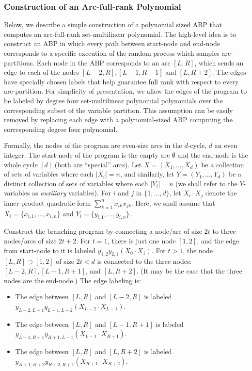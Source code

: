 \documentclass[10pt,a4paper]{article}
\theoremstyle{definition}%
\theoremstyle{plain}
\begin{document}
\subsubsection{Construction of an Arc-full-rank Polynomial}\label{subsubsec:arc-full-rank-poly}

Below, we describe a simple construction of a polynomial sized ABP that computes an arc-full-rank set-multilinear polynomial.
The high-level idea is to construct an ABP in which every path between start-node and end-node
corresponds to a specific execution of the random process which samples arc-partitions. Each node in the ABP corresponds to an arc $[L, R]$, which sends an edge to each of the nodes $[L - 2, R], [L -
1, R + 1]$ and $[L, R + 2]$. The edges have specially chosen labels that help guarantee full rank with respect to
every arc-partition. For simplicity of presentation, we allow the edges of the program to be labeled
by degree four set-multilinear polynomial polynomials over the corresponding subset of the variable partition. This assumption can be easily removed by replacing
each edge with a polynomial-sized ABP computing the corresponding degree four polynomial.

Formally, the nodes of the program are even-size arcs in the $d$-cycle, $d$ an even integer. The
start-node of the program is the empty arc $\emptyset$ and the end-node is the whole cycle $[d]$ (both are
“special” arcs). Let $X = (X_1,\ldots, X_{d})$ be a collection of sets of variables where each $|X_i| = n$, and similarly, let $Y = (Y_1,\ldots, Y_{d})$ be a distinct collection of sets of variables where each $|Y_i| = n$ (we shall refer to the $Y$-variables as \emph{auxiliary} variables). For $i$ and $j$ in $\{1,\ldots,d\}$, let $X_i \cdot X_j$ denote the inner-product quadratic form $\sum_{k = 1}^n x_{ik}x_{jk}$. Here, we shall assume that $X_i = \{x_{i,1},\ldots, x_{i,n}\}$ and $Y_i = \{y_{i,1},\ldots, y_{i,n}\}$.

Construct the branching program by connecting a node/arc of size $2t$ to three nodes/arcs of
size $2t + 2$. For $t = 1$, there is just one node $[1, 2]$, and the edge from start-node to it is labeled
$y_{1,2}y_{2,1}(X_0\cdot X_1)$. For $t > 1$, the node $[L, R] \supset [1, 2]$ of size $2t < d$ is connected to the three nodes:
$[L-2, R] , [L-1, R+ 1]$, and $[L, R+ 2]$. (It may be the case that the three nodes are the end-node.)
The edge labeling is: 
\begin{itemize}
    \item The edge  between $[L, R]$ and $[L-2, R]$ is labeled $y_{L-2,L-1}y_{L-1,L-2}(X_{L-2}\cdot X_{L-1})$.
    \item The
edge between $[L, R]$ and $[L - 1, R + 1]$ is labeled $y_{L-1,R+1}y_{R+1,L-1}(X_{L-1}\cdot X_{R+1})$.
    \item The edge between $[L, R]$
and $[L, R + 2]$ is labeled $y_{R+1,R+2}y_{R+2,R+1}(X_{R+1}\cdot X_{R+2})$.
\end{itemize}
  
\end{document}
